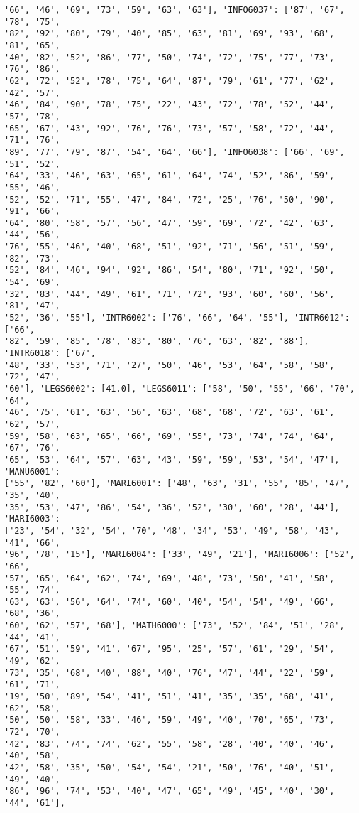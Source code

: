 \documentclass[11pt]{article}
\begin{document}
\begin{Verbatim}[commandchars=\\\{\}]
'66', '46', '69', '73', '59', '63', '63'], 'INFO6037': ['87', '67', '78', '75',
'82', '92', '80', '79', '40', '85', '63', '81', '69', '93', '68', '81', '65',
'40', '82', '52', '86', '77', '50', '74', '72', '75', '77', '73', '76', '86',
'62', '72', '52', '78', '75', '64', '87', '79', '61', '77', '62', '42', '57',
'46', '84', '90', '78', '75', '22', '43', '72', '78', '52', '44', '57', '78',
'65', '67', '43', '92', '76', '76', '73', '57', '58', '72', '44', '71', '76',
'89', '77', '79', '87', '54', '64', '66'], 'INFO6038': ['66', '69', '51', '52',
'64', '33', '46', '63', '65', '61', '64', '74', '52', '86', '59', '55', '46',
'52', '52', '71', '55', '47', '84', '72', '25', '76', '50', '90', '91', '66',
'64', '80', '58', '57', '56', '47', '59', '69', '72', '42', '63', '44', '56',
'76', '55', '46', '40', '68', '51', '92', '71', '56', '51', '59', '82', '73',
'52', '84', '46', '94', '92', '86', '54', '80', '71', '92', '50', '54', '69',
'32', '83', '44', '49', '61', '71', '72', '93', '60', '60', '56', '81', '47',
'52', '36', '55'], 'INTR6002': ['76', '66', '64', '55'], 'INTR6012': ['66',
'82', '59', '85', '78', '83', '80', '76', '63', '82', '88'], 'INTR6018': ['67',
'48', '33', '53', '71', '27', '50', '46', '53', '64', '58', '58', '72', '47',
'60'], 'LEGS6002': [41.0], 'LEGS6011': ['58', '50', '55', '66', '70', '64',
'46', '75', '61', '63', '56', '63', '68', '68', '72', '63', '61', '62', '57',
'59', '58', '63', '65', '66', '69', '55', '73', '74', '74', '64', '67', '76',
'65', '53', '64', '57', '63', '43', '59', '59', '53', '54', '47'], 'MANU6001':
['55', '82', '60'], 'MARI6001': ['48', '63', '31', '55', '85', '47', '35', '40',
'35', '53', '47', '86', '54', '36', '52', '30', '60', '28', '44'], 'MARI6003':
['23', '54', '32', '54', '70', '48', '34', '53', '49', '58', '43', '41', '66',
'96', '78', '15'], 'MARI6004': ['33', '49', '21'], 'MARI6006': ['52', '66',
'57', '65', '64', '62', '74', '69', '48', '73', '50', '41', '58', '55', '74',
'63', '63', '56', '64', '74', '60', '40', '54', '54', '49', '66', '68', '36',
'60', '62', '57', '68'], 'MATH6000': ['73', '52', '84', '51', '28', '44', '41',
'67', '51', '59', '41', '67', '95', '25', '57', '61', '29', '54', '49', '62',
'73', '35', '68', '40', '88', '40', '76', '47', '44', '22', '59', '61', '71',
'19', '50', '89', '54', '41', '51', '41', '35', '35', '68', '41', '62', '58',
'50', '50', '58', '33', '46', '59', '49', '40', '70', '65', '73', '72', '70',
'42', '83', '74', '74', '62', '55', '58', '28', '40', '40', '46', '40', '58',
'42', '58', '35', '50', '54', '54', '21', '50', '76', '40', '51', '49', '40',
'86', '96', '74', '53', '40', '47', '65', '49', '45', '40', '30', '44', '61'],

\end{Verbatim}
\end{document}
